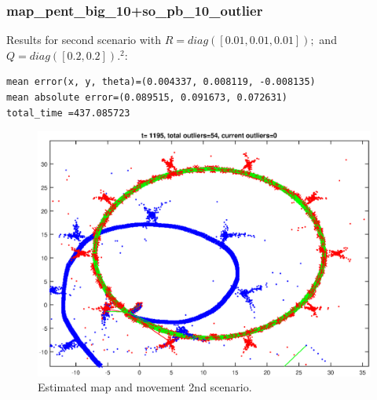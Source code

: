 \documentclass[12pt]{article}
\begin{document}
\subsubsection*{map\_pent\_big\_10+so\_pb\_10\_outlier}
Results for second scenario with \(R=diag([0.01,0.01,0.01]);\) and \(Q=diag([0.2,0.2]).^2\):
\begin{verbatim}
mean error(x, y, theta)=(0.004337, 0.008119, -0.008135)
mean absolute error=(0.089515, 0.091673, 0.072631)
total_time =437.085723
\end{verbatim}
\begin{figure}[htbp]
 \centering
 \includegraphics[width=\textwidth]{test2_fig1}
 \caption{Estimated map and movement 2nd scenario.}
\end{figure}
\end{document}

